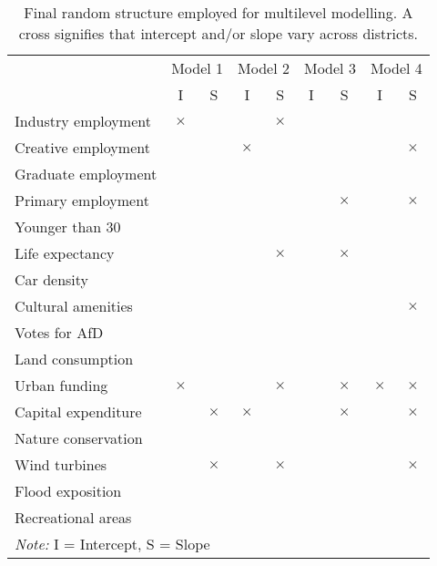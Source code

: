 \begin{table}

\caption[Final random structured employed for multilevel modelling]{\label{tab:random_structure}Final random structure employed for multilevel modelling. A cross signifies that intercept and/or slope vary across districts.}
\centering
\begin{tabular}[t]{>{}l|c>{}c|c>{}c|c>{}c|c>{}c|}
\toprule
\multicolumn{1}{c}{ } & \multicolumn{2}{c}{Model 1} & \multicolumn{2}{c}{Model 2} & \multicolumn{2}{c}{Model 3} & \multicolumn{2}{c}{Model 4} \\
\cmidrule(l{3pt}r{3pt}){2-3} \cmidrule(l{3pt}r{3pt}){4-5} \cmidrule(l{3pt}r{3pt}){6-7} \cmidrule(l{3pt}r{3pt}){8-9}
 & I & S & I & S & I & S & I & S\\
\midrule
Industry employment & $\times$ &  &  & $\times$ &  &  &  & \\
Creative employment &  &  & $\times$ &  &  &  &  & $\times$\\
Graduate employment &  &  &  &  &  &  &  & \\
Primary employment &  &  &  &  &  & $\times$ &  & $\times$\\
Younger than 30 &  &  &  &  &  &  &  & \\
Life expectancy &  &  &  & $\times$ &  & $\times$ &  & \\
Car density &  &  &  &  &  &  &  & \\
Cultural amenities &  &  &  &  &  &  &  & $\times$\\
Votes for AfD &  &  &  &  &  &  &  & \\
Land consumption &  &  &  &  &  &  &  & \\
Urban funding & $\times$ &  &  & $\times$ &  & $\times$ & $\times$ & $\times$\\
Capital expenditure &  & $\times$ & $\times$ &  &  & $\times$ &  & $\times$\\
Nature conservation &  &  &  &  &  &  &  & \\
Wind turbines &  & $\times$ &  & $\times$ &  &  &  & $\times$\\
Flood exposition &  &  &  &  &  &  &  & \\
Recreational areas &  &  &  &  &  &  &  & \\
\bottomrule
\multicolumn{9}{l}{\rule{0pt}{1em}\textit{Note: } I = Intercept, S = Slope}\\
\end{tabular}
\end{table}